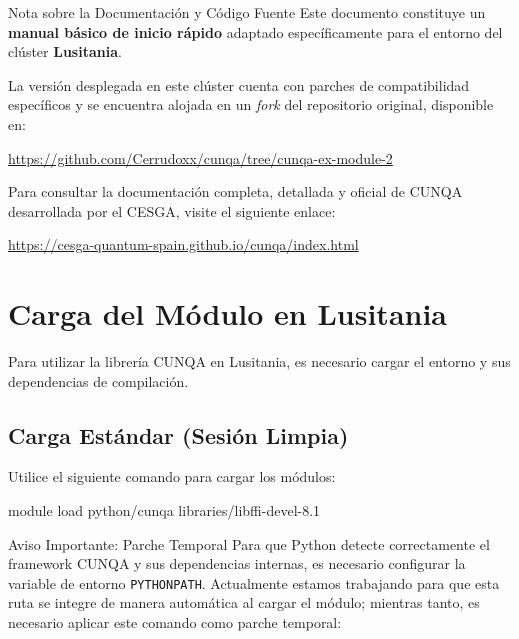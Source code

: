 \documentclass[a4paper,11pt]{article}
\begin{document}
\begin{infobox}{Nota sobre la Documentación y Código Fuente}
Este documento constituye un \textbf{manual básico de inicio rápido} adaptado específicamente para el entorno del clúster \textbf{Lusitania}.

La versión desplegada en este clúster cuenta con parches de compatibilidad específicos y se encuentra alojada en un \textit{fork} del repositorio original, disponible en:
\begin{center}
    \url{https://github.com/Cerrudoxx/cunqa/tree/cunqa-ex-module-2}
\end{center}

\vspace{0.2cm}

Para consultar la documentación completa, detallada y oficial de CUNQA desarrollada por el CESGA, visite el siguiente enlace:
\begin{center}
    \url{https://cesga-quantum-spain.github.io/cunqa/index.html}
\end{center}
\end{infobox}

\section{Carga del Módulo en Lusitania}

Para utilizar la librería CUNQA en Lusitania, es necesario cargar el entorno y sus dependencias de compilación.

\subsection{Carga Estándar (Sesión Limpia)}
Utilice el siguiente comando para cargar los módulos:

\begin{terminal}
module load python/cunqa libraries/libffi-devel-8.1
\end{terminal}

\begin{infobox}{Aviso Importante: Parche Temporal}
Para que Python detecte correctamente el framework CUNQA y sus dependencias internas, es necesario configurar la variable de entorno \texttt{PYTHONPATH}. Actualmente estamos trabajando para que esta ruta se integre de manera automática al cargar el módulo; mientras tanto, es necesario aplicar este comando como parche temporal:
\end{infobox}
\end{document}
